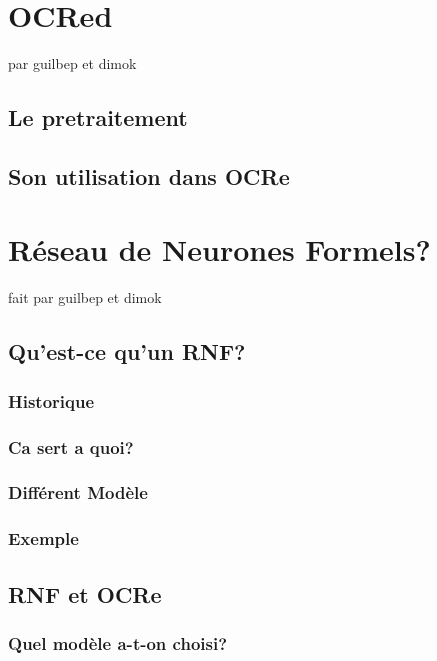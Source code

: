 \chapter{ OCRed }
par guilbep et dimok
\section{Le pretraitement}

\section{Son utilisation dans OCRe}
\subsection{}

\chapter{ R\'eseau de Neurones Formels?}
fait par guilbep et dimok

\section{ Qu'est-ce qu'un RNF?}
\subsection{Historique}
\subsection{Ca sert a quoi?}
\subsection{Diff\'erent Mod\`ele}
\subsection{Exemple}

\section{RNF et OCRe}
\subsection{Quel mod\`ele a-t-on choisi?}
